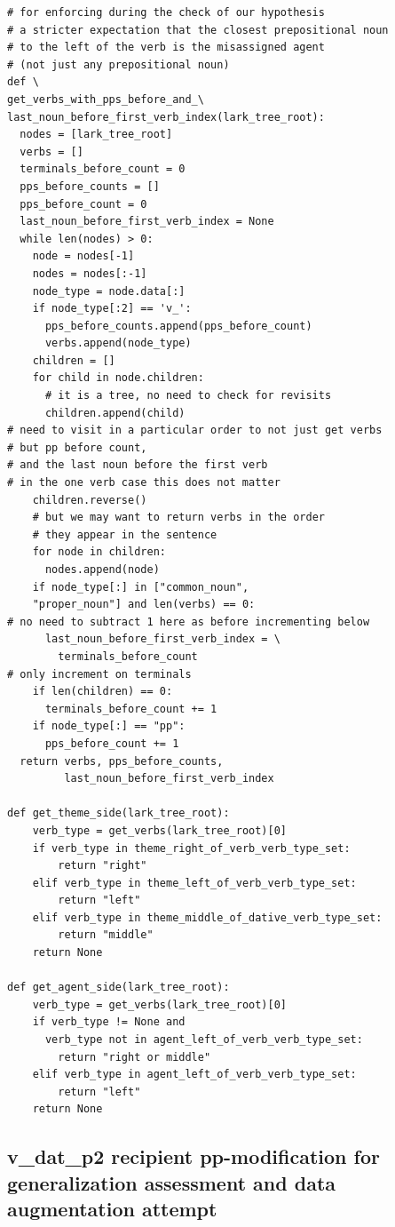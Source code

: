 \documentclass[11pt]{article}
\begin{document}
\begin{tiny}
\begin{verbatim}
# for enforcing during the check of our hypothesis
# a stricter expectation that the closest prepositional noun
# to the left of the verb is the misassigned agent
# (not just any prepositional noun)
def \
get_verbs_with_pps_before_and_\
last_noun_before_first_verb_index(lark_tree_root):
  nodes = [lark_tree_root]
  verbs = []
  terminals_before_count = 0
  pps_before_counts = []
  pps_before_count = 0
  last_noun_before_first_verb_index = None
  while len(nodes) > 0:
    node = nodes[-1]
    nodes = nodes[:-1]
    node_type = node.data[:]
    if node_type[:2] == 'v_':
      pps_before_counts.append(pps_before_count)
      verbs.append(node_type)
    children = []
    for child in node.children:
      # it is a tree, no need to check for revisits
      children.append(child)
# need to visit in a particular order to not just get verbs
# but pp before count, 
# and the last noun before the first verb
# in the one verb case this does not matter 
    children.reverse()
    # but we may want to return verbs in the order
    # they appear in the sentence
    for node in children:
      nodes.append(node)
    if node_type[:] in ["common_noun",
    "proper_noun"] and len(verbs) == 0:
# no need to subtract 1 here as before incrementing below
      last_noun_before_first_verb_index = \
        terminals_before_count
# only increment on terminals
    if len(children) == 0:
      terminals_before_count += 1
    if node_type[:] == "pp":
      pps_before_count += 1
  return verbs, pps_before_counts,
         last_noun_before_first_verb_index

def get_theme_side(lark_tree_root):
    verb_type = get_verbs(lark_tree_root)[0]
    if verb_type in theme_right_of_verb_verb_type_set:
        return "right"
    elif verb_type in theme_left_of_verb_verb_type_set:
        return "left"
    elif verb_type in theme_middle_of_dative_verb_type_set:
        return "middle"
    return None

def get_agent_side(lark_tree_root):
    verb_type = get_verbs(lark_tree_root)[0]
    if verb_type != None and 
      verb_type not in agent_left_of_verb_verb_type_set:
        return "right or middle"
    elif verb_type in agent_left_of_verb_verb_type_set:
        return "left"
    return None
\end{verbatim}
\end{tiny}

\subsection{v\_dat\_p2 recipient pp-modification for generalization assessment and data augmentation attempt}
\label{v_dat_p2_recipient_pp-modification_for_generalization_assessment_and_data_augmentation_attempt}
\end{document}

